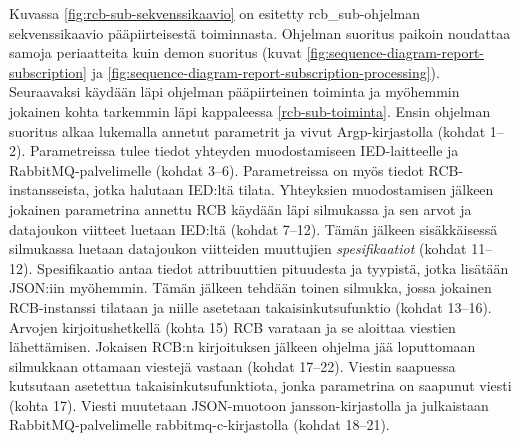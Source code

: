 Kuvassa \ref{fig:rcb-sub-sekvenssikaavio} on esitetty rcb\_sub-ohjelman sekvenssikaavio pääpiirteisestä toiminnasta. Ohjelman suoritus paikoin noudattaa samoja periaatteita kuin demon suoritus (kuvat \ref{fig:sequence-diagram-report-subscription} ja \ref{fig:sequence-diagram-report-subscription-processing}). Seuraavaksi käydään läpi ohjelman pääpiirteinen toiminta ja myöhemmin jokainen kohta tarkemmin läpi kappaleessa \ref{rcb-sub-toiminta}. Ensin ohjelman suoritus alkaa lukemalla annetut parametrit ja vivut Argp-kirjastolla (kohdat 1--2). Parametreissa tulee tiedot yhteyden muodostamiseen IED-laitteelle ja RabbitMQ-palvelimelle (kohdat 3--6). Parametreissa on myös tiedot RCB-instansseista, jotka halutaan IED:ltä tilata. Yhteyksien muodostamisen jälkeen jokainen parametrina annettu RCB käydään läpi silmukassa ja sen arvot ja datajoukon viitteet luetaan IED:ltä (kohdat 7--12). Tämän jälkeen sisäkkäisessä silmukassa luetaan datajoukon viitteiden muuttujien \emph{spesifikaatiot} (kohdat 11--12). Spesifikaatio antaa tiedot attribuuttien pituudesta ja tyypistä, jotka lisätään JSON:iin myöhemmin. Tämän jälkeen tehdään toinen silmukka, jossa jokainen RCB-instanssi tilataan ja niille asetetaan takaisinkutsufunktio (kohdat 13--16). Arvojen kirjoitushetkellä (kohta 15) RCB varataan ja se aloittaa viestien lähettämisen. Jokaisen RCB:n kirjoituksen jälkeen ohjelma jää loputtomaan silmukkaan ottamaan viestejä vastaan (kohdat 17--22). Viestin saapuessa kutsutaan asetettua takaisinkutsufunktiota, jonka parametrina on saapunut viesti (kohta 17). Viesti muutetaan JSON-muotoon jansson-kirjastolla ja julkaistaan RabbitMQ-palvelimelle rabbitmq-c-kirjastolla (kohdat 18--21).

